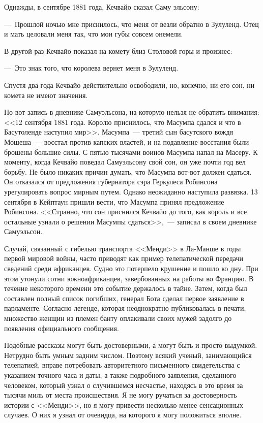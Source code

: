 \documentclass[12pt,a4paper,twoside,openany,svgnames]{memoir}
\begin{document}
Однажды, в сентябре 1881 года, Кечвайо сказал Саму эльсону:

---~Прошлой ночью мне приснилось, что меня от везли обратно в Зулуленд. Отец и мать целовали меня так, что мои губы совсем онемели.

В другой раз Кечвайо показал на комету близ Столовой горы и произнес:

---~Это знак того, что королева вернет меня в Зулуленд.

Спустя два года Кечвайо действительно освободили, но, конечно, ни его сон, ни комета не имеют значения.

Но вот запись в дневнике Самуэльсона, на которую нельзя не обратить внимания: <<12 сентября 1881 года. Королю приснилось, что Масумпа сдался и что в Басутоленде наступил мир>>. Масумпа~--- третий сын басутского вождя Мошеша~--- восстал против капских властей, и на подавление восстания были брошены большие силы. С пятью тысячами воинов Масумпа напал на Масеру. К моменту, когда Кечвайо поведал Самуэльсону свой сон, он уже почти год вел борьбу. Не было никаких причин думать, что Масумпа вот-вот должен сдаться. Он отказался от предложения губернатора сэра Геркулеса Робинсона урегулировать вопрос мирным путем. Однако неожиданно наступила развязка. 13 сентября в Кейптаун пришли вести, что Масумпа принял предложение Робинсона. <<Странно, что сон приснился Кечвайо до того, как король и все остальные узнали о решении Масумпы сдаться>>,~--- записал в своем дневнике Самуэльсон.

Случай, связанный с гибелью транспорта <<Менди>> в Ла-Манше в годы первой мировой войны, часто приводят как пример телепатической передачи сведений среди африканцев. Судно это потерпело крушение и пошло ко дну. При этом утонули сотни южноафриканцев, завербованных на работы во Францию. В течение некоторого времени это событие держалось в тайне. Затем, когда был составлен полный список погибших, генерал Бота сделал первое заявление в парламенте. Согласно легенде, которая неоднократно публиковалась в печати, множество женщин из племен банту оплакивали своих мужей задолго до появления официального сообщения.

Подобные рассказы могут быть достоверными, а могут быть и просто выдумкой. Нетрудно быть умным задним числом. Поэтому всякий ученый, занимающийся телепатией, вправе потребовать авторитетного письменного свидетельства с указанием точного часа и даты, а также подробного заявления, сделанного человеком, который узнал о случившемся несчастье, находясь в это время за тысячи миль от места происшествия. Я не могу ручаться за достоверность истории с <<Менди>>, но я могу привести несколько менее сенсационных случаев. О них я узнал от очевидца, на которого я могу положиться вполне.
\end{document}
